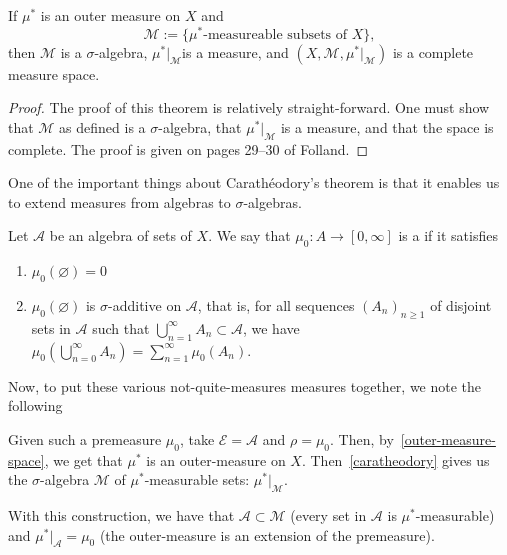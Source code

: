 \documentclass[11pt,leqno,oneside]{amsbook}
\numberwithin{thm}{section}
\renewcommand{\A}{\mathcal{A}}
\newcommand{\M}{\mathcal{M}}
\newcommand{\Ep}{\mathcal{E}}
\newcommand{\s}{$\sigma$-} %
\renewcommand{\emptyset}{\varnothing}
\begin{document}
\begin{thm}[Carathéodory]\label{caratheodory}
  If $\mu^*$ is an outer measure on $X$ and \[
    \M := \{\mu^*\text{-measureable subsets of }X\},
  \]
  then $\M$ is a \s algebra, $\mu^*|_\M$is a measure, and
  $(X,\M,\mu^*|_\M)$ is a complete measure space.
\end{thm}
\begin{proof}
  The proof of this theorem is relatively straight-forward. One must
  show that $\M$ as defined is a \s algebra, that $\mu^*|_\M$ is
  a measure, and that the space is complete. The proof is given on
  pages 29--30 of Folland.
\end{proof}
One of the important things about Carathéodory's theorem is that it
enables us to extend measures from algebras to \s algebras.
\begin{defn}
  Let $\A$ be an algebra of sets of $X$. We say that $\mu_0 \colon A \to
  [0,\infty]$ is a  if it satisfies
  \begin{enumerate}
  \item $\mu_0(\emptyset) = 0$
  \item $\mu_0(\emptyset)$ is \s additive on $\A$, that is, for
    all sequences $(A_n)_{n \geq 1}$ of disjoint sets in $\A$ such
    that $\bigcup_{n=1}^\infty A_n \subset \A$, we have $\mu_0\left(
      \bigcup_{n=0}^\infty A_n \right) = \sum_{n=1}^\infty
    \mu_0(A_n)$.
  \end{enumerate}
\end{defn}
Now, to put these various not-quite-measures measures together, we
note the following
\begin{rmk}
  Given such a premeasure $\mu_0$, take $\Ep = \A$ and $\rho =
  \mu_0$. Then, by~\ref{outer-measure-space}, we get that $\mu^*$ is
  an outer-measure on $X$. Then~\ref{caratheodory} gives us the \s algebra $\M$
  of $\mu^*$-measurable sets: $\mu^*|_\M$.
\end{rmk}
\begin{thm}\label{premeas-extension}
  With this construction, we have that $\A \subset \M$ (every set in $\A$ is $\mu^*$-measurable) and $\mu^*|_\A
  = \mu_0$ (the outer-measure is an extension of the premeasure).
\end{thm}
\end{document}

